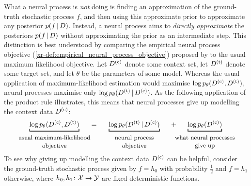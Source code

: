 \documentclass[12pt, twoside]{report}
\newcommand{\xrprefix}[1]{xr-#1}
\begin{document}
What a neural process is \emph{not} doing is finding an approximation of the ground-truth stochastic process $f$, and then using this approximate prior to approximate any posterior $p(f \,|\, D)$.
Instead, a neural process aims to \emph{directly approximate} the posteriors $p(f \,|\, D)$ without approximating the prior as an intermediate step.
This distinction is best understood by comparing the empirical neural process objective (\cref{\xrprefix{def:empirical_neural_process_objective}}) proposed by \textcite{Garnelo:2018:Conditional_Neural_Processes} to the usual maximum likelihood objective.
Let $D\us{(c)}$ denote some context set, let $D\us{(t)}$ denote some target set, and let $\theta$ be the parameters of some model.
Whereas the usual application of maximum-likelihood estimation would maximise $\log p_\theta(D\us{(c)} , D\us{(t)})$, neural processes maximise only $\log p_\theta(D\us{(t)} \cond D\us{(c)})$.
As the following application of the product rule illustrates, this means that neural processes give up modelling the context data $D\us{(c)}$:
\begin{equation}
    \underbracket[1pt]{
        \log p_\theta(D\us{(c)}, D\us{(t)})
    }_{\mathclap{\substack{
        \\[0.5\baselineskip]
        \displaystyle\text{\small usual maximum-likelihood}\vphantom{\text{\small p}}
        \\[0.5\baselineskip]
        \displaystyle\text{\small objective}
    }}}
    \hspace{15pt}=\hspace{15pt}
    \underbracket[1pt]{
        \log p_\theta(D\us{(t)} \cond D\us{(c)})
    }_{\mathclap{\substack{
        \\[0.5\baselineskip]
        \displaystyle\text{\small neural process}
        \\[0.5\baselineskip]
        \displaystyle\text{\small objective}
    }}}
    \hspace{15pt}+\hspace{15pt}
    \underbracket[1pt]{
        \log p_\theta(D\us{(c)})
    }_{\mathclap{\substack{
        \\[0.5\baselineskip]
        \displaystyle\text{\small what neural processes}
        \\[0.5\baselineskip]
        \displaystyle\text{\small give up}
    }}}
\end{equation}
To see why giving up modelling the context data $D\us{(c)}$ can be helpful,
consider the ground-truth stochastic process given by $f = h_0$ with probability $\tfrac12$ and $f = h_1$ otherwise, where $h_0, h_1 \colon \mathcal{X} \to \mathcal{Y}$ are fixed deterministic functions.
\end{document}
